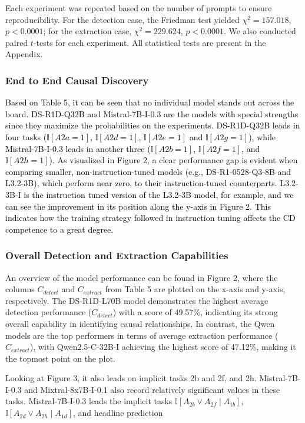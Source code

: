 \documentclass[conference]{IEEEtran}
\begin{document}
Each experiment was repeated based on the number of prompts to ensure reproducibility. For the detection case, the Friedman test yielded $\chi^2 = 157.018$, $p < 0.0001$; for the extraction case, $\chi^2 = 229.624$, $p < 0.0001$. We also conducted paired $t$-tests for each experiment. All statistical tests are present in the Appendix.

\subsubsection{End to End Causal Discovery}
\textcolor{black}{Based on Table 5, it can be seen that no individual model stands out across the board. DS-R1D-Q32B and Mistral-7B-I-0.3 are the models with special strengths since they maximize the probabilities on the experiments. DS-R1D-Q32B leads in four tasks ($\mathbb{I}[A2a=1]$, $\mathbb{I}[A2d=1]$, $\mathbb{I}[A2e=1]$ and $\mathbb{I}[A2g=1]$), while Mistral-7B-I-0.3 leads in another three ($\mathbb{I}[A2b=1]$, $\mathbb{I}[A2f=1]$, and $\mathbb{I}[A2h=1]$). As visualized in Figure 2, a clear performance gap is evident when comparing smaller, non-instruction-tuned models (e.g., DS-R1-0528-Q3-8B and L3.2-3B), which perform near zero, to their instruction-tuned counterparts. L3.2-3B-I is the instruction tuned version of the L3.2-3B model, for example, and we can see the improvement in its position along the y-axis in Figure 2.  This indicates how the training strategy followed in instruction tuning affects the CD competence to a great degree.}

\subsubsection{Overall Detection and Extraction Capabilities}
An overview of the model performance can be found in Figure 2, where the columns $C_{detect}$ and $C_{extract}$ from Table 5 are plotted on the x-axis and y-axis, respectively. The DS-R1D-L70B model demonstrates the highest average detection performance ($C_{detect}$) with a score of 49.57\%, indicating its strong overall capability in identifying causal relationships. In contrast, the Qwen models are the top performers in terms of average extraction performance ($C_{extract}$), with Qwen2.5-C-32B-I achieving the highest score of 47.12\%, making it the topmost point on the plot.

Looking at Figure 3, it also leads on implicit tasks 2b and 2f, and 2h. Mistral-7B-I-0.3 and Mixtral-8x7B-I-0.1 also record relatively significant values in these tasks. Mistral-7B-I-0.3 leads  the implicit tasks $\mathbb{I}[A_{2b}\vee A_{2f}\mid A_{1b}]$, $\mathbb{I}[A_{2d}\vee A_{2h}\mid A_{1d}]$, and headline prediction  
\end{document}
